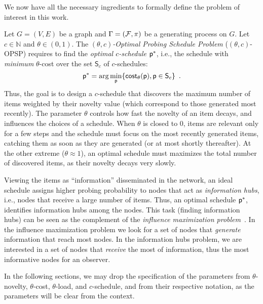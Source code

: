 We now have all the necessary ingredients to formally define the problem of
interest in this work.

 Let $G=(V,E)$ be a graph and $\Gamma=(\mathcal{F},\pi)$ be a
generating process on $G$. Let $c\in\mathbb{N}$ and
$\theta\in(0,1)$. The \emph{$(\theta,c)$-Optimal Probing Schedule Problem}
($(\theta,c)$-OPSP) requires to find the \emph{optimal $c$-schedule} $\mathsf{p}^*$,
i.e., the schedule with \emph{minimum} $\theta$-cost over the set $\mathsf{S}_c$
of $c$-schedules:
\[
	\mathsf{p}^*=\arg\min_{\mathsf{p}} \{\mathsf{cost}_\theta(\mathsf{p}), \mathsf{p}\in\mathsf{S}_c\}\enspace.
\]
Thus, the goal is to design a $c$-schedule that discovers the maximum number of items weighted by their
novelty value (which correspond to those generated most recently).
The parameter $\theta$ controls how fast the novelty of an item decays, and influences the choices of a schedule.
When $\theta$ is closed to $0$, items are relevant only for a few steps and the schedule
must focus on the most recently generated items, catching them as soon as they are generated (or at most shortly
thereafter). At the other extreme ($\theta\approx 1$), an optimal schedule
must maximizes the total number of discovered items, as their novelty decays very
slowly.

Viewing the items as ``information'' disseminated in the network,
an ideal schedule assigns higher probing probability  to nodes
that act as \emph{ information hubs}, i.e., nodes that receive a large number of
items. Thus, an optimal schedule $\mathsf{p}^*$, identifies
information hubs among the nodes. This task (finding information hubs) can be
seen as the complement of the \emph{influence maximization
problem}~\citep{Kempe2003,Kempe2005}. In the influence maximization problem we
look for a set of nodes that \emph{generate} information that reach most nodes.
In the information hubs problem, we are interested in a set of nodes that
\emph{receive} the most of information, thus the most informative nodes for an
observer.

In the following sections, we may drop the specification of the parameters
from $\theta$-novelty, $\theta$-cost, $\theta$-load, and $c$-schedule, and
from their respective notation, as the parameters will be clear from the
context.

